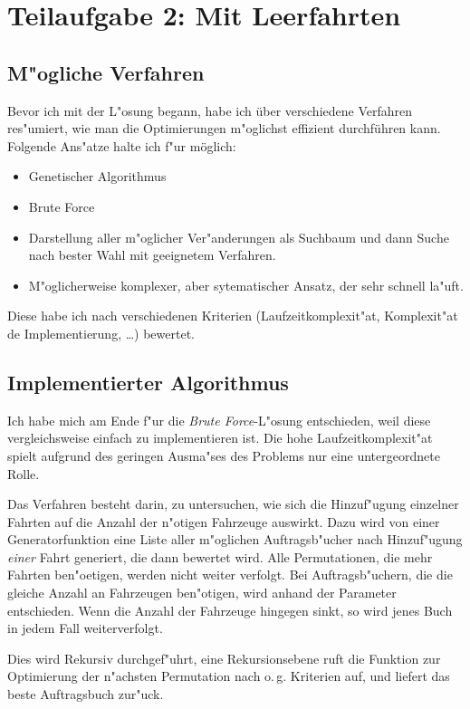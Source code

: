 \documentclass{scrreprt}
\begin{document}
\chapter{Teilaufgabe 2: Mit Leerfahrten}

\section{M"ogliche Verfahren}
Bevor ich mit der L"osung begann, habe ich über verschiedene Verfahren
res"umiert, wie man die Optimierungen m"oglichst effizient durchführen kann.
Folgende Ans"atze halte ich f"ur möglich:

\begin{itemize}
\item Genetischer Algorithmus
\item Brute Force
\item Darstellung aller m"oglicher Ver"anderungen als Suchbaum und dann Suche
nach bester Wahl mit geeignetem Verfahren.
\item M"oglicherweise komplexer, aber sytematischer Ansatz, der sehr schnell
la"uft.
\end{itemize}
Diese habe ich nach verschiedenen Kriterien (Laufzeitkomplexit"at, Komplexit"at
de Implementierung, \dots ) bewertet.

\section{Implementierter Algorithmus}
Ich habe mich am Ende f"ur die \emph{Brute Force}-L"osung entschieden, weil
diese vergleichsweise einfach zu implementieren ist.  Die hohe
Laufzeitkomplexit"at spielt aufgrund des geringen Ausma"ses des Problems nur
eine untergeordnete Rolle.

Das Verfahren besteht darin, zu untersuchen, wie sich die Hinzuf"ugung einzelner
Fahrten auf die Anzahl der n"otigen Fahrzeuge auswirkt.  Dazu wird von einer
Generatorfunktion eine Liste aller m"oglichen Auftragsb"ucher nach Hinzuf"ugung
\emph{einer} Fahrt generiert, die dann bewertet wird.  Alle Permutationen, die
mehr Fahrten ben"oetigen, werden nicht weiter verfolgt.  Bei Auftragsb"uchern,
die die gleiche Anzahl an Fahrzeugen ben"otigen, wird anhand der Parameter
entschieden.  Wenn die Anzahl der Fahrzeuge hingegen sinkt, so wird jenes Buch
in jedem Fall weiterverfolgt.

Dies wird Rekursiv durchgef"uhrt, eine Rekursionsebene ruft die Funktion zur
Optimierung der n"achsten Permutation nach o.\,g. Kriterien auf, und liefert das
beste Auftragsbuch zur"uck.
\end{document}
